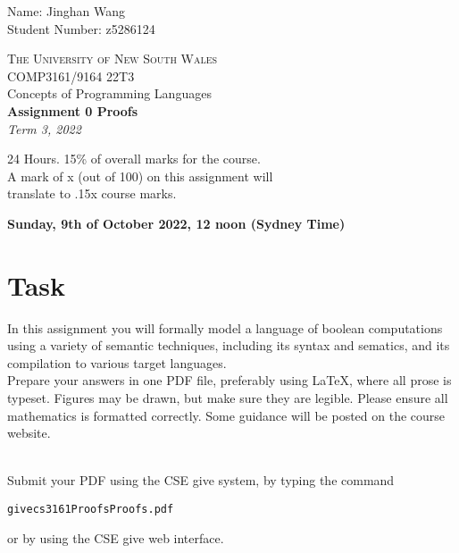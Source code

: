\documentclass[a4paper,answers]{exam}
\begin{document}
\begin{flushright}
    $\ $\\[1em] Name: Jinghan Wang \\[1em]
     Student Number: z5286124 \\[5em]
 \end{flushright}
\begin{center}
\textsc{\Large The University of New South Wales}\\[3em]
{\Huge COMP3161/9164 22T3\\[0.3em] Concepts of Programming Languages}\\[3em]
{\Large \textbf{Assignment 0
Proofs}}\\[1em]
{\large \textit{Term 3, 2022}}\\[3em]
{\large
    \begin{description}[labelindent=3em]
    \item[Marks:] 24 Hours. 15\% of overall marks for the course.\\
    A mark of x (out of 100) on this assignment will\\
    translate to .15x course marks.
    \item[Due date:] \textbf{Sunday, 9th of October 2022, 12 noon (Sydney Time)}\\[3.5em]
\end{description}
}
\end{center}

\section*{Task}
\large \noindent In this assignment you will formally model a language of boolean computations using a variety of semantic techniques, including its syntax and sematics, and its compilation to various target languages.\\
\indent Prepare your answers in one PDF file, preferably using \LaTeX, where all prose is typeset. Figures may be drawn, but make sure they are legible. Please ensure all mathematics is formatted correctly. Some guidance will be posted on the course website.\\\\
{\large \noindent Submit your PDF using the CSE give system, by typing the command
\begin{alltt}
give cs3161 Proofs Proofs.pdf
\end{alltt}
or by using the CSE give web interface.}

\newpage
\end{document}
